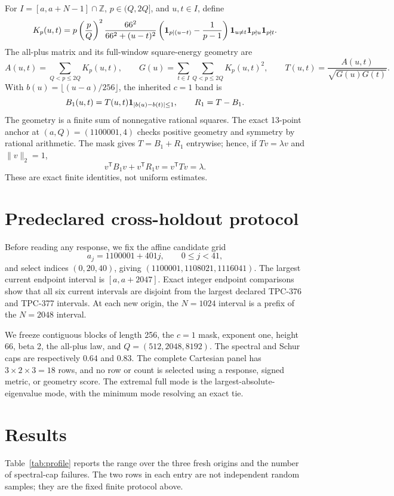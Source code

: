 \documentclass[10pt]{article}
\begin{document}
For $I=[a,a+N-1]\cap\mathbb Z$, $p\in(Q,2Q]$, and $u,t\in I$, define
\[
 K_p(u,t)=p\left(\frac pQ\right)^2
 \frac{66^2}{66^2+(u-t)^2}
 \left({\bf1}_{p\mid(u-t)}-\frac1{p-1}\right)
 {\bf1}_{u\ne t}{\bf1}_{p\nmid u}{\bf1}_{p\nmid t}.
\]
The all-plus matrix and its full-window square-energy geometry are
\[
 A(u,t)=\sum_{Q<p\le2Q}K_p(u,t),\qquad
 G(u)=\sum_{t\in I}\sum_{Q<p\le2Q}K_p(u,t)^2,
 \qquad T(u,t)=\frac{A(u,t)}{\sqrt{G(u)G(t)}}.
\]
With $b(u)=\lfloor(u-a)/256\rfloor$, the inherited $c=1$ band is
\[
 B_1(u,t)=T(u,t){\bf1}_{|b(u)-b(t)|\le1},
 \qquad R_1=T-B_1.
\]
The geometry is a finite sum of nonnegative rational squares.  The exact
13-point anchor at $(a,Q)=(1100001,4)$ checks positive geometry and symmetry
by rational arithmetic.  The mask gives $T=B_1+R_1$ entrywise; hence, if
$Tv=\lambda v$ and $\|v\|_2=1$,
\[
 v^\mathsf{T}B_1v+v^\mathsf{T}R_1v
 =v^\mathsf{T}Tv=\lambda.
\]
These are exact finite identities, not uniform estimates.

\section{Predeclared cross-holdout protocol}

Before reading any response, we fix the affine candidate grid
\[
 a_j=1100001+401j,\qquad 0\le j<41,
\]
and select indices $(0,20,40)$, giving
$(1100001,1108021,1116041)$.  The largest current endpoint interval is
$[a,a+2047]$.  Exact integer endpoint comparisons show that all six current
intervals are disjoint from the largest declared TPC-376 and TPC-377
intervals.  At each new origin, the $N=1024$ interval is a prefix of the
$N=2048$ interval.

We freeze contiguous blocks of length 256, the $c=1$ mask, exponent one,
height 66, beta 2, the all-plus law, and $Q=(512,2048,8192)$.  The spectral
and Schur caps are respectively $0.64$ and $0.83$.  The complete Cartesian
panel has $3\times2\times3=18$ rows, and no row or count is selected using a
response, signed metric, or geometry score.  The extremal full mode is the
largest-absolute-eigenvalue mode, with the minimum mode resolving an exact
tie.

\section{Results}

Table~\ref{tab:profile} reports the range over the three fresh origins and
the number of spectral-cap failures.  The two rows in each entry are not
independent random samples; they are the fixed finite protocol above.
\end{document}
